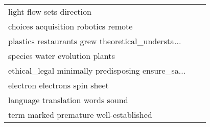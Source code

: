 \begin{tabular}{lll}
                         light flow sets direction &                                                    &                                                    \\
               choices acquisition robotics remote &                                                    &                                                    \\
 plastics restaurants grew theoretical\_understa... &                                                    &                                                    \\
                    species water evolution plants &                                                    &                                                    \\
 ethical\_legal minimally predisposing ensure\_sa... &                                                    &                                                    \\
                     electron electrons spin sheet &                                                    &                                                    \\
                  language translation words sound &                                                    &                                                    \\
            term marked premature well-established &                                                    &                                                    \\
\bottomrule
\end{tabular}
